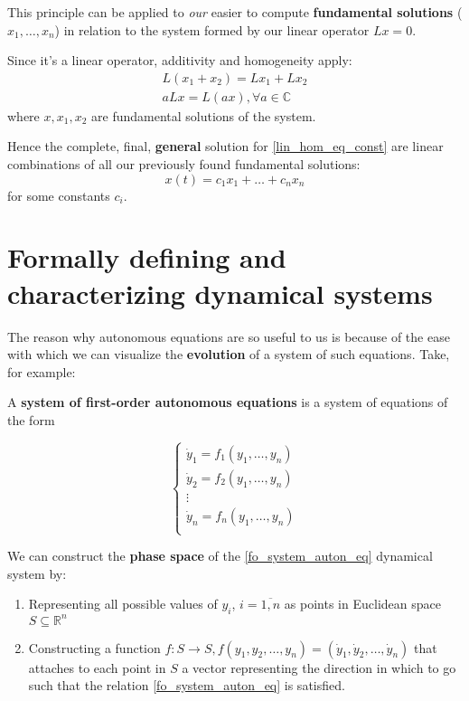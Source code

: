 This principle can be applied to \textit{our} easier to compute \textbf{fundamental solutions} ($x_1,\dots,x_n$) in relation to the system formed by our linear operator $Lx =0$.

Since it's a linear operator, additivity and homogeneity apply:
\begin{gather*}
  L(x_1+x_2) = Lx_1 + Lx_2\\
  aLx = L(ax) , \forall a \in \mathbb{C}
\end{gather*}
where $x,x_1,x_2$ are fundamental solutions of the system.

Hence the complete, final, \textbf{general} solution for \ref{lin_hom_eq_const} are linear combinations of all our previously found fundamental solutions:
\[
  x(t) = c_1 x_1 + \dots + c_nx_n
\]
for some constants $c_i$.
\newpage
\section{Formally defining and characterizing dynamical systems}
The reason why autonomous equations are so useful to us is because of the ease with which we can visualize the \textbf{evolution} of a system of such equations.
Take, for example:
\begin{definition}
  A \textbf{system of first-order autonomous equations} is a system of equations of the form

  \begin{equation}\label{fo_system_auton_eq}
    \begin{cases}
      \dot{y}_1 = f_1(y_1,\dots, y_n) \\
      \dot{y}_2 = f_2(y_1,\dots, y_n) \\
      \vdots                          \\
      \dot{y}_n = f_n(y_1,\dots, y_n) \\
    \end{cases}
  \end{equation}
\end{definition}

\begin{definition}
  We can construct the \textbf{phase space} of the \ref{fo_system_auton_eq} dynamical system by:

  \begin{enumerate}
    \item Representing all possible values of $y_i$, $ i = \overline{1,n}$ as points in Euclidean space $S \subseteq \mathbb{R}^n$

    \item Constructing a function $f : S \rightarrow S, f(y_1,y_2,\dots,y_n) = (\dot{y}_1,\dot{y}_2,\dots,\dot{y}_n)$ that attaches to each point in $S$ a vector representing the direction in which to go such that the relation \ref{fo_system_auton_eq} is satisfied.
  \end{enumerate}
\end{definition}

